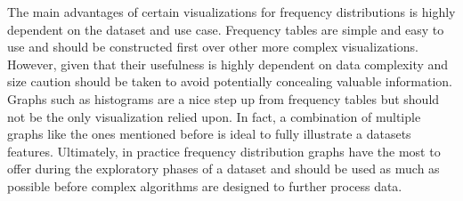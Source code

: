 The main advantages of certain visualizations for frequency distributions is highly 
dependent on the dataset and use case. Frequency tables are simple and easy to 
use and should be constructed first over other more complex visualizations. 
However, given that their usefulness is highly dependent on data complexity and 
size caution should be taken to avoid potentially concealing valuable information. 
Graphs such as histograms are a nice step up from frequency tables but should not 
be the only visualization relied upon. In fact, a combination of multiple graphs 
like the ones mentioned before is ideal to fully illustrate a datasets features. 
Ultimately, in practice frequency distribution graphs have the most to offer during 
the exploratory phases of a dataset and should be used as much as possible before 
complex algorithms are designed to further process data. 